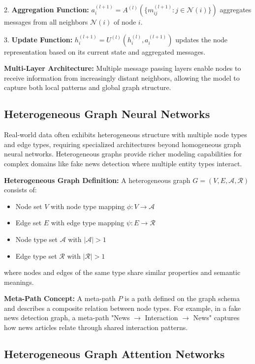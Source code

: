 2. \textbf{Aggregation Function:} $a_i^{(l+1)} = A^{(l)}(\{m_{ij}^{(l+1)} : j \in \mathcal{N}(i)\})$ aggregates messages from all neighbors $\mathcal{N}(i)$ of node $i$.

3. \textbf{Update Function:} $h_i^{(l+1)} = U^{(l)}(h_i^{(l)}, a_i^{(l+1)})$ updates the node representation based on its current state and aggregated messages.

\textbf{Multi-Layer Architecture:} Multiple message passing layers enable nodes to receive information from increasingly distant neighbors, allowing the model to capture both local patterns and global graph structure.

\subsection{Heterogeneous Graph Neural Networks}

Real-world data often exhibits heterogeneous structure with multiple node types and edge types, requiring specialized architectures beyond homogeneous graph neural networks. Heterogeneous graphs provide richer modeling capabilities for complex domains like fake news detection where multiple entity types interact.

\textbf{Heterogeneous Graph Definition:} A heterogeneous graph $G = (V, E, \mathcal{A}, \mathcal{R})$ consists of:
\begin{itemize}
\item Node set $V$ with node type mapping $\phi: V \rightarrow \mathcal{A}$
\item Edge set $E$ with edge type mapping $\psi: E \rightarrow \mathcal{R}$  
\item Node type set $\mathcal{A}$ with $|\mathcal{A}| > 1$
\item Edge type set $\mathcal{R}$ with $|\mathcal{R}| > 1$
\end{itemize}

where nodes and edges of the same type share similar properties and semantic meanings.

\textbf{Meta-Path Concept:} A meta-path $P$ is a path defined on the graph schema and describes a composite relation between node types. For example, in a fake news detection graph, a meta-path "News $\rightarrow$ Interaction $\rightarrow$ News" captures how news articles relate through shared interaction patterns.

\subsection{Heterogeneous Graph Attention Networks}

